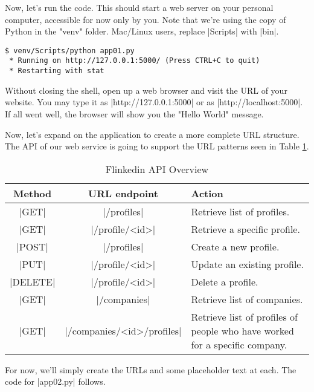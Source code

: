 \documentclass[11pt]{book}
\newcommand{\head}[1]{\textnormal{\textbf{#1}}} %
\begin{document}
Now, let's run the code.  This should start a web server on your personal computer, accessible for now only by you.  Note that we're using the copy of Python in the "venv" folder.  Mac/Linux users, replace |Scripts| with |bin|.

\begin{verbatim}
$ venv/Scripts/python app01.py
 * Running on http://127.0.0.1:5000/ (Press CTRL+C to quit)
 * Restarting with stat
\end{verbatim}

Without closing the shell, open up a web browser and visit the URL of your website.  You may type it as |http://127.0.0.1:5000| or as |http://localhost:5000|.  If all went well, the browser will show you the "Hello World" message.

Now, let's expand on the application to create a more complete URL structure.  The API of our web service is going to support the URL patterns seen in Table \ref{tab:flinkedinapi}.

\begin{table}
\centering
\caption{Flinkedin API Overview}\label{tab:flinkedinapi}
\vspace{10pt}
\begin{tabular}{ccp{5cm}}
    \toprule[1.5pt]
    \head{Method} & \head{URL endpoint} & \head{Action} \\
    \midrule
    |GET| & |/profiles| & Retrieve list of profiles.\\
    \midrule
    |GET| & |/profile/<id>| & Retrieve a specific profile.\\
    \midrule
    |POST| & |/profiles| & Create a new profile.\\
    \midrule
    |PUT| & |/profile/<id>| & Update an existing profile.\\
    \midrule
    |DELETE| & |/profile/<id>| & Delete a profile.\\
    \midrule
    |GET| & |/companies| & Retrieve list of companies.\\
    \midrule
    |GET| & |/companies/<id>/profiles| & Retrieve list of profiles of people who have worked for a specific company.\\
    \bottomrule[1.5pt]
\end{tabular}
\end{table}

For now, we'll simply create the URLs and some placeholder text at each.  The code for |app02.py| follows.
\end{document}
